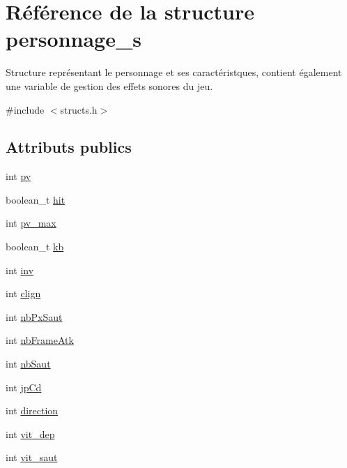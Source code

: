 \hypertarget{structpersonnage__s}{}\section{Référence de la structure personnage\+\_\+s}
\label{structpersonnage__s}


Structure représentant le personnage et ses caractéristques, contient également une variable de gestion des effets sonores du jeu.  




{\ttfamily \#include $<$structs.\+h$>$}

\subsection*{Attributs publics}
\begin{DoxyCompactItemize}
\item 
int \hyperlink{structpersonnage__s_ab3090d9110756af454516f939e9f8a86}{pv}
\item 
boolean\+\_\+t \hyperlink{structpersonnage__s_a4e8b537e5d529d22745957acb499d00c}{hit}
\item 
int \hyperlink{structpersonnage__s_a0e58c8761de9044ce770f21aa9ada41a}{pv\+\_\+max}
\item 
boolean\+\_\+t \hyperlink{structpersonnage__s_aa492d3f9ab87bf03fcb94a65b77bcd34}{kb}
\item 
int \hyperlink{structpersonnage__s_a1d76a383232b764037a80a8b39b3c378}{inv}
\item 
int \hyperlink{structpersonnage__s_a219acff65d3b506a69408ca316efeeec}{clign}
\item 
int \hyperlink{structpersonnage__s_a47e8c34ccb98b49ca57baa55d4326ee3}{nb\+Px\+Saut}
\item 
int \hyperlink{structpersonnage__s_a9dc9cf38290d069f2bfbdfe1b19184ac}{nb\+Frame\+Atk}
\item 
int \hyperlink{structpersonnage__s_a1b5dac574e8ad57eaa9989699fbfb139}{nb\+Saut}
\item 
int \hyperlink{structpersonnage__s_a05d061a818efa6b7bfa5b3c76ba3b8dd}{jp\+Cd}
\item 
int \hyperlink{structpersonnage__s_a6d6791f61e66ee9ee1125c39bc99f164}{direction}
\item 
int \hyperlink{structpersonnage__s_a6899a0efdc3a3fccb060aaf06b4e4b8d}{vit\+\_\+dep}
\item 
int \hyperlink{structpersonnage__s_abf199b160e1ce327b7def1ed1ee00b39}{vit\+\_\+saut}
\item 

\end{DoxyCompactItemize}
